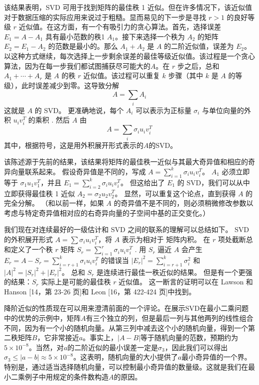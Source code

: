 \documentclass[11pt,a4paper,twoside]{article}
\begin{document}
\begin{CJK}{UTF8}{gbsn}
该结果表明，SVD 可用于找到矩阵的最佳秩 1 近似。但在许多情况下，该近似值对于数据压缩的实际应用来说过于粗糙。显而易见的下一步是寻找 $r>1$ 的良好等级 $r$ 近似值。在这方面，有一个有吸引力的贪心算法。首先，选择误差 $E_{1}=A-A_{1}$ 具有最小范数的秩1 $A_{1}$。接下来选择一个秩为 $A_{2}$ 的矩阵 $E_{2}=E_{1}-A_{2}$ 的范数是最小的。那么 $A_{1}+A_{2}$ 是 $A$ 的二阶近似值，误差为 $E_{2}$。以这种方式继续，每次选择上一步剩余误差的最佳等级近似值。该过程是一个贪心算法，因为在每一步我们都试图捕获尽可能大的$A$。在 $r$ 步之后，总和 $A_{1}+\cdots+A_{r}$ 是 $A$ 的秩 $r$ 近似值。该过程可以重复 $k$ 步骤（其中 $k$ 是 $A$ 的等级），此时误差减少到零。这导致分解
$$
A=\sum_{i} A_{i}
$$
这就是 $A$ 的 SVD。 更准确地说，每个 $A_{i}$ 可以表示为正标量 $\sigma_{i}$ 与单位向量的外积 $u_{i} v_{i}^{T}$ 的乘积 . 然后 $A$ 由
$$
A=\sum_{i} \sigma_{i} u_{i} v_{i}^{T}
$$
其中，根据符号，这是用外积展开形式表示的$A$的SVD。

该陈述源于先前的结果，该结果将矩阵的最佳秩一近似与其最大奇异值和相应的奇异向量联系起来。 假设奇异值是不同的，写成 $A=\sum_{i=1}^{k} \sigma_{i} u_{i} v_{i}^{T}$。 $A_{1}$ 必须立即等于 $\sigma_{1} u_{1} v_{1}^{T}$，并且 $E_{1}=\sum_{i=2}^{k} \sigma_{i} u_{i} v_{i}^{T}$。 但这给出了 $E_{1}$ 的 SVD，我们可以从中立即获得最佳秩 1 近似 $A_{2}=\sigma_{2} u_{2} v_{2}^{T}$。 显然，可以重复这个论点，直到获得 $A$ 的完全分解。 （和以前一样，如果 $A$ 的奇异值不是不同的，则必须稍微修改参数以考虑与特定奇异值相对应的右奇异向量的子空间中基的正交变化。）

我们现在对连续最好的一级估计和 SVD 之间的联系的理解可以总结如下。 SVD 的外积展开形式 $A=\sum \sigma_{i} u_{i} v_{i}^{T}$，将 $A$ 表示为相对于 矩阵内积。 在 $r$ 项处截断总和定义了一个秩 $r$ 矩阵 $S_{r}=\sum_{i=1}^{r} \sigma_{i} u_{i} v_{i}^{T}$ . 用 $S_{r}$ 逼近 $A$ 会产生 $E_{r}=A-S_{r}=\sum_{i=r+1}^{k} \sigma_{i} u_{i}  v_{i}^{T}$ 的错误当 $\left|E_{r}\right|^{2}=\sum_{i=r+1}^{k} \sigma_{i}^{2}$ 和 $|A|^{2}=\left|S_{r}\right|^{2}+\left|E_{r}\right|^{2}$。 总和 $S_{r}$ 是连续进行最佳一秩近似的结果。 但是有一个更强的结果：$S_{r}$ 实际上是可能的最佳秩 $r$ 近似值。 这一断言的证明可以在 Lawson 和 Hanson [14，第 23-26 页]和 Leon [16，第 422-424 页]中找到。

降阶近似的性质现在可以用来澄清前面的一个评论。在展示SVD在最小二乘问题中的优势的示例中，矩阵$A$有三个独立的列，但是最后一列与其他两列的线性组合不同，因为有一个小的随机向量。从第三列中减去这个小的随机向量，得到一个第二秩矩阵$B$，它非常接近$ a $。事实上，$|A-B|$等于随机向量的范数，预期约为$5 \times 10^{-8}$。当然，对$ a $的二阶近似的最小误差一定是$\sigma_{3}$，因此我们可以得出$\sigma_{3} \leq| a - b | \approx 5 \times 10^{-8}$。这表明，随机向量的大小提供了$ a $最小奇异值的一个界。特别是，通过适当选择随机向量，可以控制最小奇异值的数量级。这就是我们在最小二乘例子中用规定的条件数构造$A$的原因。


\end{CJK}
\end{document}
